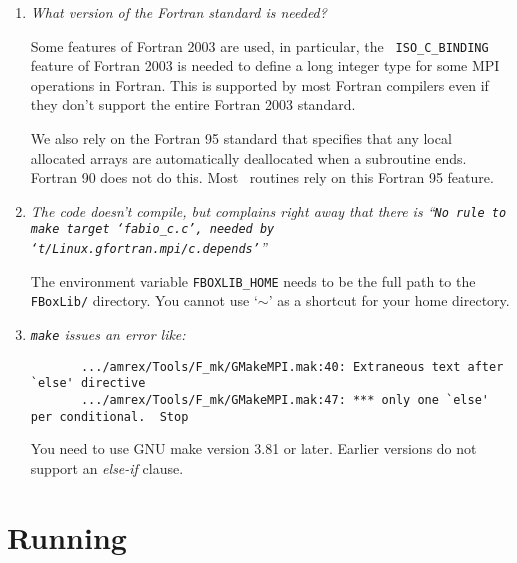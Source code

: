 \begin{enumerate}

\item {\em What version of the Fortran standard is needed?}

  Some features of Fortran 2003 are used, in particular, the {\tt
    ISO\_C\_BINDING} feature of Fortran 2003 is needed to define a long
  integer type for some MPI operations in Fortran.  This is supported
  by most Fortran compilers even if they don't support the entire
  Fortran 2003 standard.

  We also rely on the Fortran 95 standard that specifies that any
  local allocated arrays are automatically deallocated when a
  subroutine ends.  Fortran 90 does not do this.  Most
  \maestro\ routines rely on this Fortran 95 feature.


\item {\em The code doesn't compile, but complains right away that there
   is ``{\tt No rule to make target `fabio\_c.c', needed by `t/Linux.gfortran.mpi/c.depends'}''}

   The environment variable {\tt FBOXLIB\_HOME} needs to be the full path
   to the {\tt FBoxLib/} directory.  You cannot use `{\tt $\sim$}' as a shortcut
   for your home directory.
  
\item {\em {\tt make} issues an error like:
       {\small
       \begin{verbatim}
       .../amrex/Tools/F_mk/GMakeMPI.mak:40: Extraneous text after `else' directive
       .../amrex/Tools/F_mk/GMakeMPI.mak:47: *** only one `else' per conditional.  Stop
      \end{verbatim}
      }
      }

   You need to use GNU make version 3.81 or later.  Earlier versions do
   not support an {\em else-if} clause.

\end{enumerate}

\section{Running}

